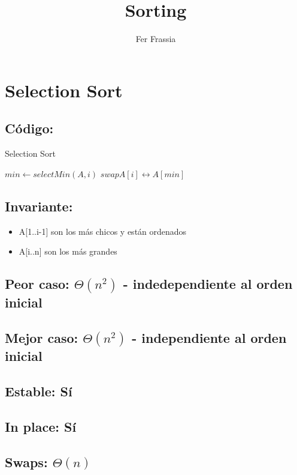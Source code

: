 \documentclass[a4paper]{article}
\begin{document}
\title{Sorting}
\author{Fer Frassia}
\maketitle
\tableofcontents

\newpage
\section{Selection Sort}

\subsection{C\'odigo:}
\begin{algorithm}
\caption{Selection Sort}\label{selection}
\begin{algorithmic}[1]
   	\State $min \gets selectMin(A, i)$ 
	\State $swap A[i] \leftrightarrow A[min]$ 
    \EndFor
\EndProcedure
\end{algorithmic}
\end{algorithm}

\subsection{Invariante:}
\begin{itemize}
	\item{A[1..i-1] son los m\'as chicos y est\'an ordenados}
	\item{A[i..n] son los m\'as grandes}
\end{itemize}

\subsection{Peor caso: $\Theta (n^{2})$ - indedependiente al orden inicial}
\subsection{Mejor caso: $\Theta (n^{2})$ - independiente al orden inicial}
\subsection{Estable: S\'i}
\subsection{In place: S\'i}
\subsection{Swaps: $\Theta (n)$}
\end{document}
